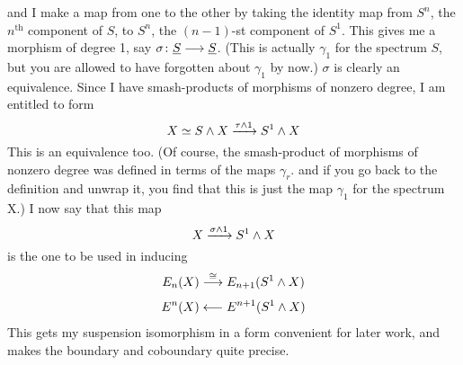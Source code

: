 \documentclass[../main]{subfiles}
\begin{document}
    and I make a map from one to the other by taking the identity map from $S^n$, the $n^\text{th}$ component of $S$, to $S^n$, the $(n-1)$-st component of $S^1$. This gives me a morphism of degree 1, say $\sigma\colon \underline{S}\longrightarrow \underline{S}$. (This is actually $\gamma_1$ for the spectrum $S$, but you are allowed to have forgotten about $\gamma_1$ by now.) $\sigma$ is clearly an equivalence. Since I have smash-products of morphisms of nonzero degree, I am entitled to form
    \[X\simeq S\wedge X \vra{\tau\wedge 1} S^1\wedge X\]
    This is an equivalence too. (Of course, the smash-product of morphisms of nonzero degree was defined in terms of the maps $\gamma_r$. and if you go back to the definition and unwrap it, you find that this is just the map $\gamma_1$ for the spectrum X.) I now say that this map
    \[X\vra{\sigma\wedge 1}S^1\wedge X\]
    is the one to be used in inducing
    \begin{align}
        E_n(X) &\vra{\cong}E_{n+1}(S^1\wedge X) \nonumber \\
        E^n(X) &\longleftarrow E^{n+1}(S^1\wedge X) \nonumber
    \end{align}
    This gets my suspension isomorphism in a form convenient for later work, and makes the boundary and coboundary quite precise.
\end{document}
